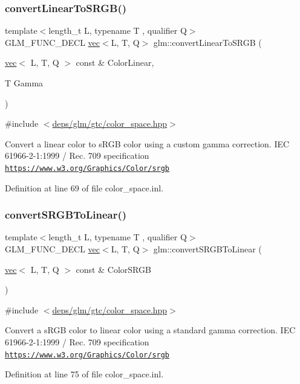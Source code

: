 \subsubsection{\texorpdfstring{convert\+Linear\+To\+S\+R\+G\+B()}{convertLinearToSRGB()}\hspace{0.1cm}{\footnotesize\ttfamily [2/2]}}
{\footnotesize\ttfamily template$<$length\+\_\+t L, typename T , qualifier Q$>$ \\
G\+L\+M\+\_\+\+F\+U\+N\+C\+\_\+\+D\+E\+CL \hyperlink{structglm_1_1vec}{vec}$<$L, T, Q$>$ glm\+::convert\+Linear\+To\+S\+R\+GB (\begin{DoxyParamCaption}\item[{\hyperlink{structglm_1_1vec}{vec}$<$ L, T, Q $>$ const \&}]{Color\+Linear,  }\item[{T}]{Gamma }\end{DoxyParamCaption})}



{\ttfamily \#include $<$\hyperlink{gtc_2color__space_8hpp}{deps/glm/gtc/color\+\_\+space.\+hpp}$>$}

Convert a linear color to s\+R\+GB color using a custom gamma correction. I\+EC 61966-\/2-\/1\+:1999 / Rec. 709 specification \href{https://www.w3.org/Graphics/Color/srgb}{\tt https\+://www.\+w3.\+org/\+Graphics/\+Color/srgb} 

Definition at line 69 of file color\+\_\+space.\+inl.

\mbox{\label{group__gtc__color__space_ga16c798b7a226b2c3079dedc55083d187}} 
\subsubsection{\texorpdfstring{convert\+S\+R\+G\+B\+To\+Linear()}{convertSRGBToLinear()}}
{\footnotesize\ttfamily template$<$length\+\_\+t L, typename T , qualifier Q$>$ \\
G\+L\+M\+\_\+\+F\+U\+N\+C\+\_\+\+D\+E\+CL \hyperlink{structglm_1_1vec}{vec}$<$L, T, Q$>$ glm\+::convert\+S\+R\+G\+B\+To\+Linear (\begin{DoxyParamCaption}\item[{\hyperlink{structglm_1_1vec}{vec}$<$ L, T, Q $>$ const \&}]{Color\+S\+R\+GB }\end{DoxyParamCaption})}



{\ttfamily \#include $<$\hyperlink{gtc_2color__space_8hpp}{deps/glm/gtc/color\+\_\+space.\+hpp}$>$}

Convert a s\+R\+GB color to linear color using a standard gamma correction. I\+EC 61966-\/2-\/1\+:1999 / Rec. 709 specification \href{https://www.w3.org/Graphics/Color/srgb}{\tt https\+://www.\+w3.\+org/\+Graphics/\+Color/srgb} 

Definition at line 75 of file color\+\_\+space.\+inl.

